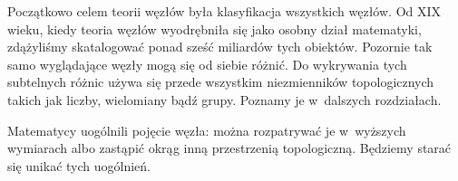 Początkowo celem teorii węzłów była klasyfikacja wszystkich węzłów.
Od XIX wieku, kiedy teoria węzłów wyodrębniła się jako osobny dział matematyki, zdążyliśmy skatalogować ponad sześć miliardów tych obiektów.
Pozornie tak samo wyglądające węzły mogą się od siebie różnić.
Do wykrywania tych subtelnych różnic używa się przede wszystkim niezmienników topologicznych takich jak liczby, wielomiany bądź grupy.
Poznamy je w~dalszych rozdziałach.

Matematycy uogólnili pojęcie węzła: można rozpatrywać je w~wyższych wymiarach albo zastąpić okrąg inną przestrzenią topologiczną.
Będziemy starać się unikać tych uogólnień.
